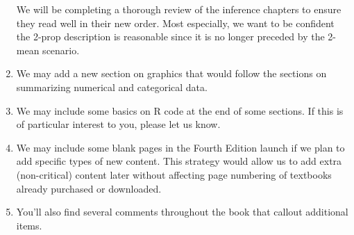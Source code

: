 \begin{enumerate}
    We will be completing a thorough review of the inference
    chapters to ensure they read well in their new order.
    Most especially, we want to be confident the 2-prop
    description is reasonable since it is no longer preceded
    by the 2-mean scenario.
\item
    We may add a new section on graphics
    that would follow the sections on summarizing numerical
    and categorical data.
\item
    We may include some basics on R code at the end
    of some sections.
    If this is of particular interest to you,
    please let us know.
\item
    We may include some blank pages in the Fourth Edition
    launch if we plan to add specific types of new content.
    This strategy would allow us to add extra (non-critical)
    content later without affecting page numbering of
    textbooks already purchased or downloaded.
\item
    You'll also find several comments throughout the book
    that callout additional items.
\end{enumerate}







